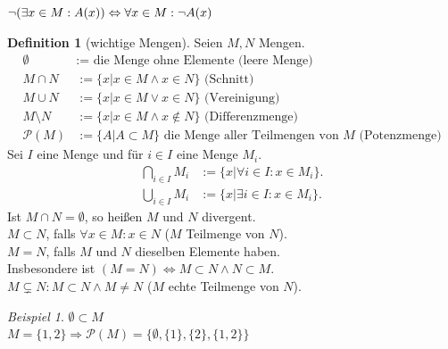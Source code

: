\documentclass[12pt,a4paper,titlepage]{article} %
\theoremstyle{definition}
\newtheorem{defi}[satz]{Definition}
\theoremstyle{remark}
\newtheorem*{bsp}{Beispiel}
\begin{document}
$\neg (\exists x \in M : A(x)) \\ \Leftrightarrow \forall x \in M : \neg A(x)$
\begin{defi}[wichtige Mengen]
	Seien $M,N$ Mengen.
	\begin{align*}
		\emptyset &:= \text{ die Menge ohne Elemente (leere Menge)}\\
		M \cap N &:= \{x | x \in M \wedge x \in N \} \text{ (Schnitt)}\\
		M \cup N &:= \{x | x \in M \vee x \in N \} \text{ (Vereinigung)}\\
		M \setminus N &:= \{x | x \in M \wedge x \notin N \} \text{ (Differenzmenge)}\\
		\mathcal{P}(M) &:= \{A | A \subset M \} \text{ die Menge aller Teilmengen von } M \text{ (Potenzmenge)}
	\end{align*}
	Sei $I$ eine Menge und für $i\in I$ eine Menge $M_i$.
	\begin{align*}
		\bigcap\limits_{i\in I} M_i &:= \{x | \forall i \in I:x\in M_i\}.\\	
		\bigcup\limits_{i\in I} M_i &:= \{x | \exists i \in I:x\in M_i\}.
	\end{align*}
	Ist $M\cap N = \emptyset$, so heißen $M$ und $N$ divergent.\\
	$M\subset N$, falls $\forall x \in M: x \in N$ ($M$ Teilmenge von $N$).\\
	$M = N$, falls $M$ und $N$ dieselben Elemente haben.\\
	Insbesondere ist $(M=N) \Leftrightarrow M\subset N \wedge N\subset M$.\\
	$M \subsetneq N : M \subset N \wedge M \neq N$ ($M$ echte Teilmenge von $N$).
\end{defi}
\begin{bsp}
$\emptyset \subset M$\\
$M = \{1,2\} \Rightarrow \mathcal{P}(M) = \{\emptyset, \{1\}, \{2\}, \{1,2\}\}$
\end{bsp}
\end{document}

